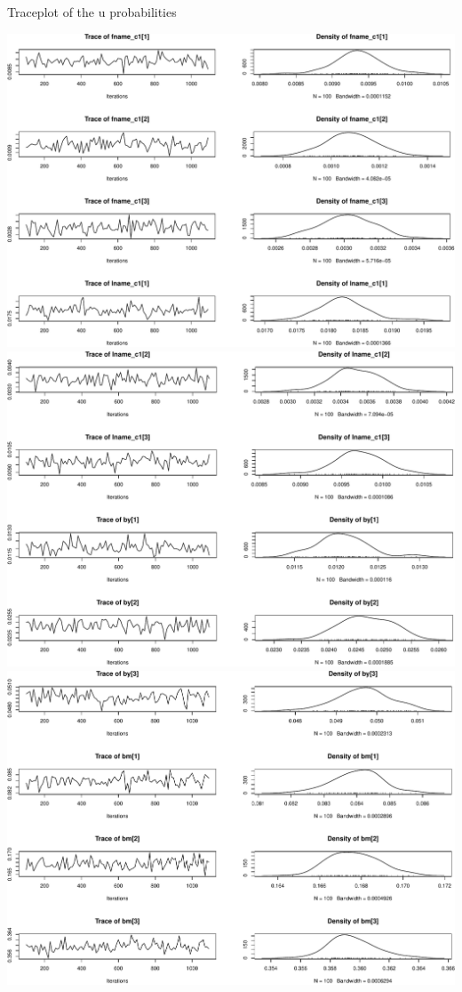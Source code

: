 \documentclass[
  ignorenonframetext,
]{beamer}
\begin{document}
\begin{frame}{Traceplot of the u probabilities}
\protect\hypertarget{traceplot-of-the-u-probabilities}{}

\includegraphics{bayesian-fellegi-sunter-vignette_files/figure-beamer/unnamed-chunk-11-1.pdf}
\includegraphics{bayesian-fellegi-sunter-vignette_files/figure-beamer/unnamed-chunk-11-2.pdf}
\includegraphics{bayesian-fellegi-sunter-vignette_files/figure-beamer/unnamed-chunk-11-3.pdf}

\end{frame}
\end{document}
